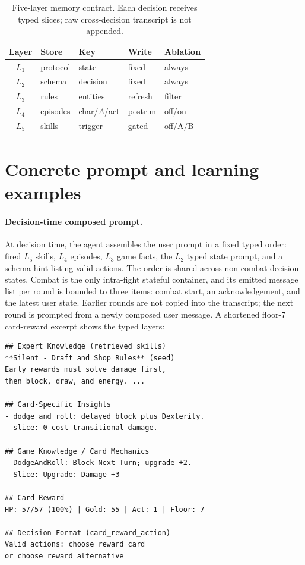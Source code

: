 \begin{table}[H]
\centering\footnotesize
\caption{Five-layer memory contract. Each decision receives typed slices; raw cross-decision transcript is not appended.}
\label{tab:memory-contract}
\setlength{\tabcolsep}{4pt}
\renewcommand{\arraystretch}{1.08}
\begin{tabular*}{\columnwidth}{@{\extracolsep{\fill}}cllll@{}}
\toprule
Layer & Store & Key & Write & Ablation \\
\midrule
$L_1$ & protocol & state & fixed & always \\
$L_2$ & schema & decision & fixed & always \\
$L_3$ & rules & entities & refresh & filter \\
$L_4$ & episodes & char/$A$/act & postrun & off/on \\
$L_5$ & skills & trigger & gated & off/A/B \\
\bottomrule
\end{tabular*}
\end{table}
\FloatBarrier

\section{Concrete prompt and learning examples}
\label{app:artifacts}

\paragraph{Decision-time composed prompt.}
At decision time, the agent assembles the user prompt in a fixed
typed order: fired $L_5$ skills, $L_4$ episodes, $L_3$ game facts,
the $L_2$ typed state prompt, and a schema hint listing valid
actions. The order is shared across non-combat decision states. Combat
is the only intra-fight stateful container, and its emitted message
list per round is bounded to three items: combat start, an
acknowledgement, and the latest user state. Earlier rounds are not
copied into the transcript; the next round is prompted from a newly
composed user message. A shortened floor-7 card-reward excerpt shows
the typed layers:

\begin{Verbatim}[fontsize=\footnotesize]
## Expert Knowledge (retrieved skills)
**Silent - Draft and Shop Rules** (seed)
Early rewards must solve damage first,
then block, draw, and energy. ...

## Card-Specific Insights
- dodge and roll: delayed block plus Dexterity.
- slice: 0-cost transitional damage.

## Game Knowledge / Card Mechanics
- DodgeAndRoll: Block Next Turn; upgrade +2.
- Slice: Upgrade: Damage +3

## Card Reward
HP: 57/57 (100%) | Gold: 55 | Act: 1 | Floor: 7

## Decision Format (card_reward_action)
Valid actions: choose_reward_card
or choose_reward_alternative
\end{Verbatim}

